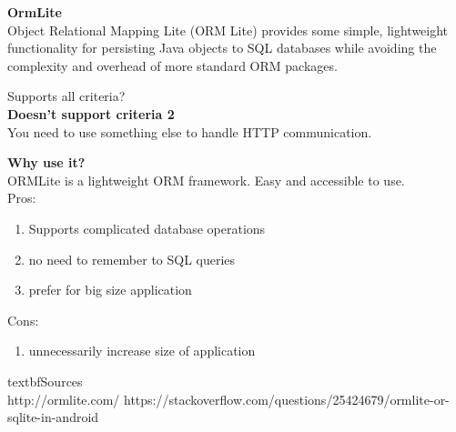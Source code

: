 		\textbf{OrmLite} \\
		Object Relational Mapping Lite (ORM Lite) provides some simple, lightweight functionality for persisting Java objects to SQL databases while avoiding the complexity and overhead of more standard ORM packages.

		Supports all criteria?\\
		\textbf{Doesn't support criteria 2}\\
		You need to use something else to handle HTTP communication.
		
		\textbf{Why use it?} \\
		ORMLite is a lightweight ORM framework. Easy and accessible to use.\\
		
		Pros:
		\begin{enumerate}
		\item Supports complicated database operations
		\item no need to remember to SQL queries
		\item prefer for big size application
		\end{enumerate}
		Cons:
		\begin{enumerate}
		\item unnecessarily increase size of application
		\end{enumerate}
	
	textbf{Sources}\\
	http://ormlite.com/
	https://stackoverflow.com/questions/25424679/ormlite-or-sqlite-in-android